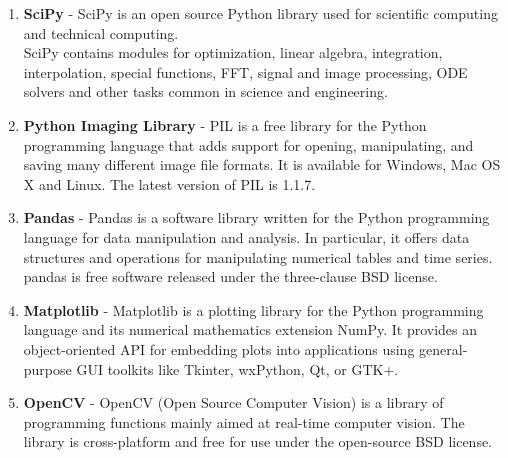 \begin{enumerate}
\begin{itemize}
	\end{itemize}
	
	\item \textbf{SciPy} - SciPy is an open source Python library used for scientific computing and technical computing.\\
	SciPy contains modules for optimization, linear algebra, integration, interpolation, special functions, FFT, signal and image processing, ODE solvers and other tasks common in science and engineering.
	
	\item \textbf{Python Imaging Library} - PIL is a free library for the Python programming language that adds support for opening, manipulating, and saving many different image file formats. It is available for Windows, Mac OS X and Linux. The latest version of PIL is 1.1.7.
	
	\item \textbf{Pandas} - Pandas is a software library written for the Python programming language for data manipulation and analysis. In particular, it offers data structures and operations for manipulating numerical tables and time series. pandas is free software released under the three-clause BSD license.
	
	\item \textbf{Matplotlib} - Matplotlib is a plotting library for the Python programming language and its numerical mathematics extension NumPy. It provides an object-oriented API for embedding plots into applications using general-purpose GUI toolkits like Tkinter, wxPython, Qt, or GTK+.
	
	\item \textbf{OpenCV} - OpenCV (Open Source Computer Vision) is a library of programming functions mainly aimed at real-time computer vision. The library is cross-platform and free for use under the open-source BSD license.
	
\end{enumerate}

